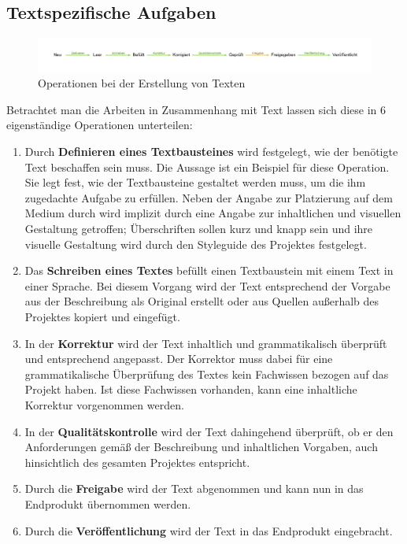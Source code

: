 \subsection{Textspezifische Aufgaben}

\begin{figure}[htb]
\begin{center}
\includegraphics[width=\textwidth]{media/chart-3.pdf}
\end{center}
\caption{Operationen bei der Erstellung von Texten}
\label{chart:3}
\end{figure}

Betrachtet man die Arbeiten in Zusammenhang mit Text lassen sich diese in 6 eigenständige Operationen unterteilen:

\begin{enumerate}
\item{Durch \textbf{Definieren eines Textbausteines} wird festgelegt, wie der benötigte Text beschaffen sein muss. Die Aussage  ist ein Beispiel für diese Operation. Sie legt fest, wie der Textbausteine gestaltet werden muss, um die ihm zugedachte Aufgabe zu erfüllen. Neben der Angabe zur Platzierung auf dem Medium durch  wird implizit durch  eine Angabe zur inhaltlichen und visuellen Gestaltung getroffen; Überschriften sollen kurz und knapp sein und ihre visuelle Gestaltung wird durch den Styleguide des Projektes festgelegt.}
\item{Das \textbf{Schreiben eines Textes} befüllt einen Textbaustein mit einem Text in einer Sprache. Bei diesem Vorgang wird der Text entsprechend der Vorgabe aus der Beschreibung als Original erstellt oder aus Quellen außerhalb des Projektes kopiert und eingefügt. }
\item{In der \textbf{Korrektur} wird der Text inhaltlich und grammatikalisch überprüft und entsprechend angepasst. Der Korrektor muss dabei für eine grammatikalische Überprüfung des Textes kein Fachwissen bezogen auf das Projekt haben. Ist diese Fachwissen vorhanden, kann eine inhaltliche Korrektur vorgenommen werden.}
\item{In der \textbf{Qualitätskontrolle} wird der Text dahingehend überprüft, ob er den Anforderungen gemäß der Beschreibung und inhaltlichen Vorgaben, auch hinsichtlich des gesamten Projektes entspricht. }
\item{Durch die \textbf{Freigabe} wird der Text abgenommen und kann nun in das Endprodukt übernommen werden.}
\item{Durch die \textbf{Veröffentlichung} wird der Text in das Endprodukt eingebracht.}
\end{enumerate}

